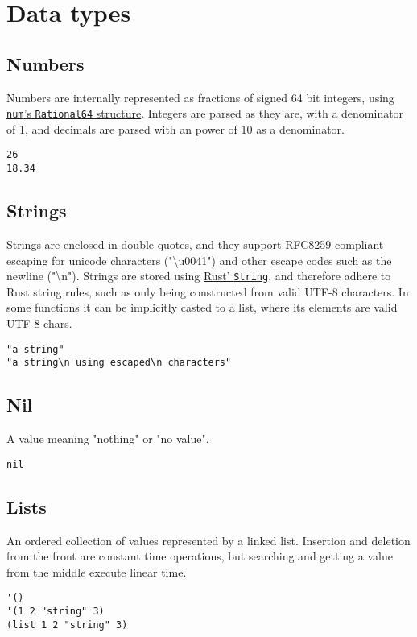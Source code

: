 \documentclass[11pt]{scrreprt}
\begin{document}
\chapter{Data types}
\section{Numbers}
Numbers are internally represented as fractions of signed 64 bit integers, using \href{https://docs.rs/num/0.4.0/num/rational/type.Rational64.html}{\texttt{num}'s \texttt{Rational64} structure}. Integers are parsed as they are, with a denominator of 1, and decimals are parsed with an power of 10 as a denominator.
\begin{verbatim}
26
18.34
\end{verbatim}

\section{Strings}
Strings are enclosed in double quotes, and they support RFC8259-compliant escaping for unicode characters ("\textbackslash u0041") and other escape codes such as the newline ("\textbackslash n"). Strings are stored using \href{https://doc.rust-lang.org/stable/std/string/struct.String.html}{Rust' \texttt{String}}, and therefore adhere to Rust string rules, such as only being constructed from valid UTF-8 characters. In some functions it can be implicitly casted to a list, where its elements are valid UTF-8 chars.
\begin{verbatim}
"a string"
"a string\n using escaped\n characters"
\end{verbatim}

\section{Nil}
A value meaning "nothing" or "no value".
\begin{verbatim}
nil
\end{verbatim}

\section{Lists}
An ordered collection of values represented by a linked list. Insertion and deletion from the front are constant time operations, but searching and getting a value from the middle execute linear time.
\begin{verbatim}
'()
'(1 2 "string" 3)
(list 1 2 "string" 3)
\end{verbatim}
\end{document}

